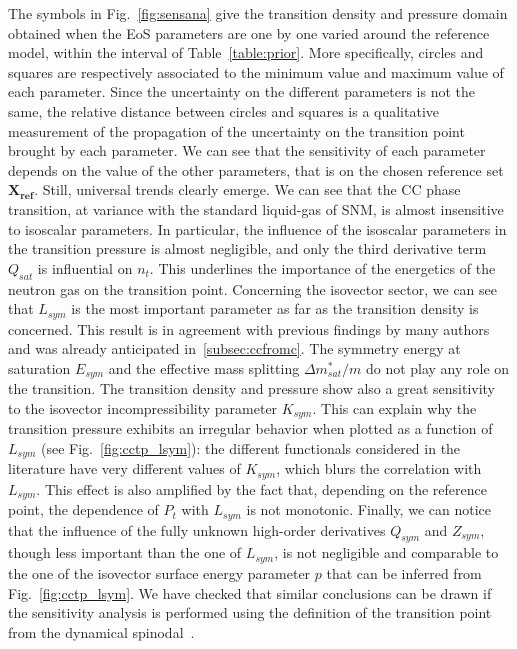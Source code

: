 The symbols in Fig.~\ref{fig:sensana} give the transition density and 
pressure domain obtained when the EoS parameters are one by one varied around 
the reference model, within the interval of Table~\ref{table:prior}. More
specifically, circles and squares are respectively associated to the minimum
value and maximum value of each parameter.
Since the uncertainty on the different parameters is not the same, the 
relative distance between circles and squares is a qualitative measurement of 
the propagation of the uncertainty on the transition point brought by each 
parameter. We can see that the sensitivity of each parameter depends on the 
value of the other parameters, that is on the chosen reference set 
$\bm{X_{ref}}$. Still, universal trends clearly emerge. We can see that the CC 
phase transition, at variance with the 
standard liquid-gas of SNM, is almost insensitive to isoscalar parameters. 
In particular, the influence of the isoscalar parameters in the 
transition pressure is almost negligible, and only the third derivative term 
$Q_{sat}$ is influential on $n_t$. This underlines the importance of 
the energetics of the neutron gas on the transition point. Concerning the 
isovector sector, we can see that $L_{sym}$ is the most important 
parameter as far as the transition density is concerned. This result is in 
agreement with previous findings by many authors~\cite{Ducoin2011} and was
already anticipated in~\ref{subsec:ccfromc}.
The symmetry energy at saturation $E_{sym}$ and the effective mass splitting
$\Delta m_{sat}^*/m$ do not play any role on the transition. 
The transition density and pressure show also a great 
sensitivity to the isovector incompressibility parameter $K_{sym}$. 
This can explain why the transition pressure exhibits an irregular behavior 
when plotted as a function of $L_{sym}$ (see Fig.~\ref{fig:cctp_lsym}): the 
different functionals considered in the literature have very different values 
of $K_{sym}$, which blurs the correlation with $L_{sym}$. This effect is also 
amplified by the fact that, depending on the reference point, the dependence of 
$P_t$ with $L_{sym}$ is not monotonic. Finally, we can notice that the 
influence of the fully unknown high-order derivatives $Q_{sym}$ and $Z_{sym}$, 
though less important than the one of $L_{sym}$, is not negligible and 
comparable to the one of the isovector surface energy parameter $p$ that can be 
inferred from Fig.~\ref{fig:cctp_lsym}. We have checked that similar 
conclusions can be drawn if the sensitivity analysis is performed using the 
definition of the transition point from the dynamical 
spinodal~\cite{Antic2019}.

